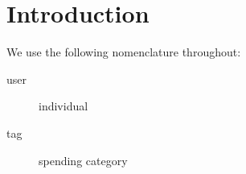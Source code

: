 
\section{Introduction}%
\label{sec:introduction}

We use the following nomenclature throughout:
\begin{description}
    \item[user] individual
    \item[tag] spending category
\end{description}









